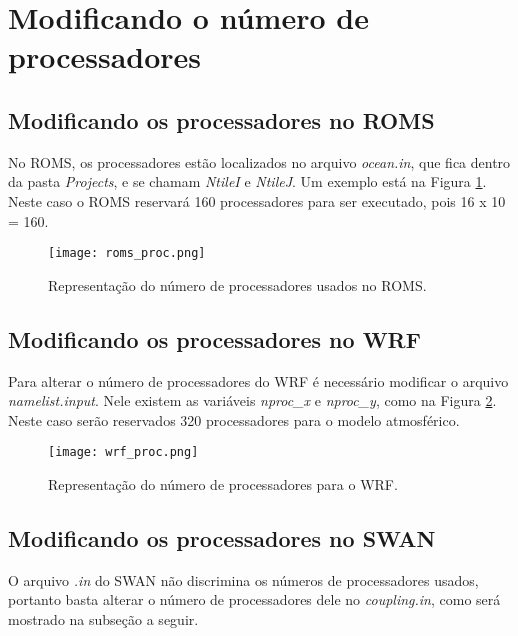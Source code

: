 \section{Modificando o número de processadores}
\bigskip

\subsection{Modificando os processadores no ROMS}
\bigskip

\noindent No ROMS, os processadores estão localizados no arquivo \textit{ocean.in}, que fica dentro da pasta \textit{Projects}, e se chamam \textit{NtileI} e \textit{NtileJ}. Um exemplo está na Figura \textcolor{bleu_cite}{\ref{romsproc}}. Neste caso o ROMS reservará 160 processadores para ser executado, pois 16 x 10 = 160.
\bigskip

\begin{figure}[H]
    \centering
    \texttt{[image: roms\_proc.png]}
    \caption{Representação do número de processadores usados no ROMS.}
    \label{romsproc}
\end{figure}
\bigskip

\subsection{Modificando os processadores no WRF}
\bigskip

\noindent Para alterar o número de processadores do WRF é necessário modificar o arquivo \textit{namelist.input}. Nele existem as variáveis \textit{nproc\_x} e \textit{nproc\_y}, como na Figura \textcolor{bleu_cite}{\ref{procswrf}}. Neste caso serão reservados 320 processadores para o modelo atmosférico.
\bigskip

\begin{figure}[H]
    \centering
    \texttt{[image: wrf\_proc.png]}
    \caption{Representação do número de processadores para o WRF.}
    \label{procswrf}
\end{figure}
\bigskip

\subsection{Modificando os processadores no SWAN}

\bigskip O arquivo \textit{.in} do SWAN não discrimina os números de processadores usados, portanto basta alterar o número de processadores dele no \textit{coupling.in}, como será mostrado na subseção a seguir.
\bigskip

